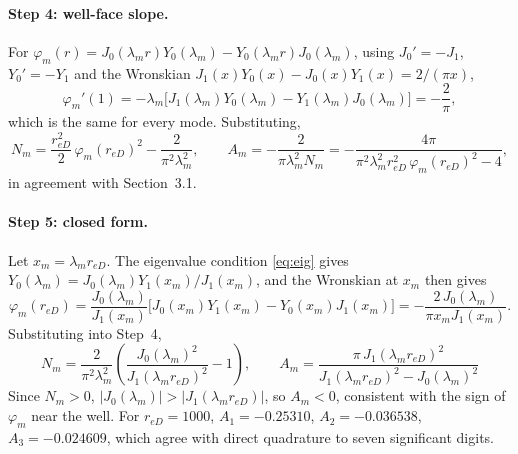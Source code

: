 \documentclass[11pt]{article}
\newcommand{\reD}{r_{eD}}
\begin{document}
\paragraph{Step 4: well-face slope.}
For $\varphi_m(r)=J_0(\lambda_m r)Y_0(\lambda_m)-Y_0(\lambda_m r)J_0(\lambda_m)$, using $J_0'=-J_1$, $Y_0'=-Y_1$ and the
Wronskian $J_1(x)Y_0(x)-J_0(x)Y_1(x)=2/(\pi x)$,
\begin{equation}
  \varphi_m'(1) = -\lambda_m\Big[J_1(\lambda_m)Y_0(\lambda_m)-Y_1(\lambda_m)J_0(\lambda_m)\Big] = -\frac{2}{\pi},
\end{equation}
which is the same for every mode. Substituting,
\begin{equation}
  N_m = \frac{\reD^2}{2}\,\varphi_m(\reD)^2 - \frac{2}{\pi^2\lambda_m^2},\qquad
  A_m = -\frac{2}{\pi\lambda_m^2 N_m} = -\frac{4\pi}{\pi^2\lambda_m^2\reD^2\,\varphi_m(\reD)^2 - 4},
\end{equation}
in agreement with Section~3.1.

\paragraph{Step 5: closed form.}
Let $x_m=\lambda_m\reD$. The eigenvalue condition \eqref{eq:eig} gives $Y_0(\lambda_m)=J_0(\lambda_m)Y_1(x_m)/J_1(x_m)$, and
the Wronskian at $x_m$ then gives
\begin{equation}
  \varphi_m(\reD) = \frac{J_0(\lambda_m)}{J_1(x_m)}\Big[J_0(x_m)Y_1(x_m)-Y_0(x_m)J_1(x_m)\Big]
  = -\frac{2\,J_0(\lambda_m)}{\pi x_m J_1(x_m)} .
\end{equation}
Substituting into Step~4,
\begin{equation}
  \boxed{\;
  N_m = \frac{2}{\pi^2\lambda_m^2}\left(\frac{J_0(\lambda_m)^2}{J_1(\lambda_m\reD)^2}-1\right),\qquad
  A_m = \frac{\pi\,J_1(\lambda_m\reD)^2}{J_1(\lambda_m\reD)^2 - J_0(\lambda_m)^2}
  \;}
\end{equation}
Since $N_m>0$, $|J_0(\lambda_m)|>|J_1(\lambda_m\reD)|$, so $A_m<0$, consistent with the sign of $\varphi_m$ near the well.
For $\reD=1000$, $A_1=-0.25310$, $A_2=-0.036538$, $A_3=-0.024609$, which agree with direct quadrature to seven
significant digits.
\end{document}

